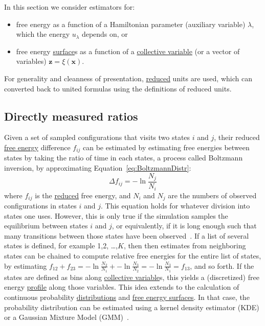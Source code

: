 \documentclass[9pt,review]{livecoms}
\newcommand{\vx}{\mathbf{x}}
\newcommand{\vz}{\mathbf{z}}
\begin{document}
In this section we consider estimators for:
\begin{itemize}
    \item free energy as a function of a Hamiltonian parameter (auxiliary variable) $\lambda$, which the energy $u_\lambda$ depends on, or
    \item free energy \hyperlink{ref:FES} {surface}s as a function of a \hyperlink{ref:CV} {collective variable} (or a vector of variables) $\vz = \xi(\vx)$.
\end{itemize}

For generality and cleanness of presentation, \hyperlink{ref:reduced} {reduced} units are used, which can converted back to united formulas using the definitions of reduced units.

\subsection{Directly measured ratios}

Given a set of sampled configurations that visits two states $i$ and $j$, their reduced \hyperlink{ref:FE} {free energy} difference $f_{ij}$ can be estimated by estimating free energies between states by taking the ratio of time in each states, a process called Boltzmann inversion, by approximating Equation~\eqref{eq:BoltzmannDistr}:
\begin{equation}
\Delta f_{ij} = -\ln \frac{N_j}{N_i}
\label{eq:boltzmann_inversion}
\end{equation}
where $f_{ij}$ is the \hyperlink{ref:reduced} {reduced} free energy, and $N_i$ and $N_j$ are the numbers of observed configurations in states $i$ and $j$.  This equation holds for whatever division into states one uses. However, this is only true if the simulation samples the equilibrium between states $i$ and $j$, or equivalently, if it is long enough such that many transitions between those states have been observed~\cite{No2009}. If a list of several states is defined, for example 1,2, \ldots,$K$, then then estimates from neighboring states can be chained to compute relative free energies for the entire list of states, by estimating $f_{12} + f_{23} = -\ln \frac{N_2}{N_1} + -\ln \frac{N_3}{N_2} =   -\ln \frac{N_3}{N_1} = f_{13}$, and so forth. If the states are defined as bins along \hyperlink{ref:CV} {collective variable}s, this yields a (discretized) free energy \hyperlink{ref:FES} {profile} along those variables. This idea extends to the calculation of continuous probability \hyperlink{ref:Distribution} {distributions} and \hyperlink{ref:FES} {free energy surfaces}. In that case, the probability distribution can be estimated using a kernel density estimator (KDE) or a Gaussian Mixture Model (GMM)~\cite{Westerlund2017}.
\end{document}
